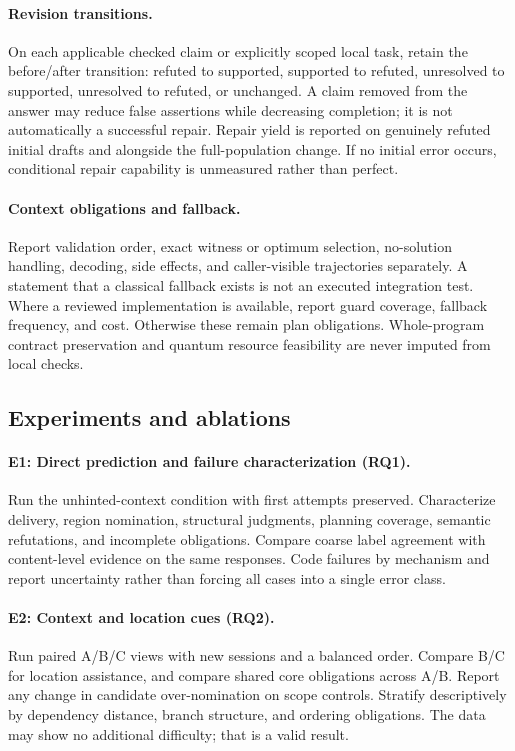 \paragraph{Revision transitions.}
On each applicable checked claim or explicitly scoped local task, retain the
before/after transition: refuted to supported, supported to refuted, unresolved
to supported, unresolved to refuted, or unchanged. A claim removed from the answer
may reduce false assertions while decreasing completion; it is not automatically
a successful repair. Repair yield is reported on genuinely refuted initial drafts
and alongside the full-population change. If no initial error occurs, conditional
repair capability is unmeasured rather than perfect.

\paragraph{Context obligations and fallback.}
Report validation order, exact witness or optimum selection, no-solution handling,
decoding, side effects, and caller-visible trajectories separately. A statement
that a classical fallback exists is not an executed integration test. Where a
reviewed implementation is available, report guard coverage, fallback frequency,
and cost. Otherwise these remain plan obligations. Whole-program contract
preservation and quantum resource feasibility are never imputed from local checks.

\subsection{Experiments and ablations}
\label{sec:experiments}
\paragraph{E1: Direct prediction and failure characterization (RQ1).}
Run the unhinted-context condition with first attempts preserved. Characterize
delivery, region nomination, structural judgments, planning coverage, semantic
refutations, and incomplete obligations. Compare coarse label agreement with
content-level evidence on the same responses. Code failures by mechanism and
report uncertainty rather than forcing all cases into a single error class.

\paragraph{E2: Context and location cues (RQ2).}
Run paired A/B/C views with new sessions and a balanced order. Compare B/C for
location assistance, and compare shared core obligations across A/B. Report any
change in candidate over-nomination on scope controls. Stratify descriptively by
dependency distance, branch structure, and ordering obligations. The data may
show no additional difficulty; that is a valid result.

